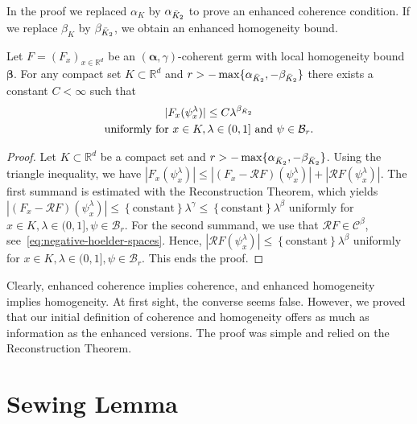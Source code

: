 In the proof we replaced \( \alpha_{K} \) by \( \alpha_{\bar{K}_{2}} \) to prove an enhanced coherence condition. If we replace \( \beta_{K} \) by \( \beta_{\bar{K}_{2}} \), we obtain an enhanced homogeneity bound.

\begin{theorem}
  Let \( F = (F_x)_{x \in \mathbb{R}^d} \) be an \( (\bm{\alpha}, \gamma) \)-coherent germ with local homogeneity bound \( \bm{\beta} \). For any compact set \( K \subset \mathbb{R}^d \) and \( r > - \max\{ \alpha_{\bar{K}_{2}}, - \beta_{\bar{K}_{2}} \} \) there exists a constant \( C < \infty \) such that
  \begin{gather*}
    |F_x(\psi^\lambda_x)| \leq C \lambda^{\beta_{\bar{K}_{2}}}
    \\
    \text{uniformly for \(x \in K, \lambda \in (0,1] \) and \( \psi \in \mathcal{B}_r \).}
  \end{gather*}
\end{theorem}

\begin{proof}
  Let \( K \subset \mathbb{R}^d \) be a compact set and \( r > - \max\{ \alpha_{\bar{K}_{2}}, - \beta_{\bar{K}_{2}} \} \). Using the triangle inequality, we have \( |F_x(\psi^\lambda_x)| \leq |(F_x -\mathcal{R}F)(\psi^\lambda_x)| + |\mathcal{R}F(\psi^\lambda_x)| \). The first summand is estimated with the Reconstruction Theorem, which yields  \( |(F_x -\mathcal{R}F)(\psi^\lambda_x)| \leq \left\{ \mathrm{constant} \right \} \lambda^\gamma \leq \left\{ \mathrm{constant} \right\} \lambda^\beta \) uniformly for \( x \in K, \lambda \in (0,1], \psi \in \mathcal{B}_r \). For the second summand, we use that \( \mathcal{R}F \in \mathcal{C}^\beta \), see~\eqref{eq:negative-hoelder-spaces}. Hence, \( |\mathcal{R}F(\psi^\lambda_x) | \leq \left\{ \mathrm{constant} \right\} \lambda^\beta \)  uniformly for \( x \in K, \lambda \in (0,1], \psi \in \mathcal{B}_r \). This ends the proof.
\end{proof}

Clearly, enhanced coherence implies coherence, and enhanced homogeneity implies homogeneity. At first sight, the converse seems false. However, we proved that our initial definition of coherence and homogeneity offers as much as information as the enhanced versions. The proof was simple and relied on the Reconstruction Theorem.

\section{Sewing Lemma}

